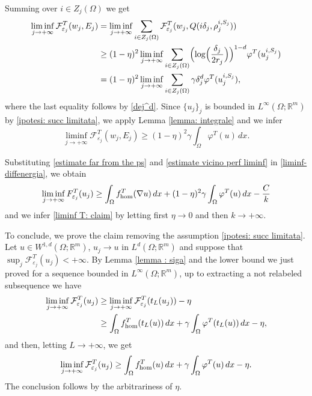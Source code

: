 \documentclass{article}
\theoremstyle{plain}
\theoremstyle{definition}
\def\rr{{\mathbb R}}
\newcommand{\f}{\varphi}
\newcommand{\ej}{\varepsilon_j}
\newcommand{\rj}{r_j}
\newcommand{\dej}{\delta_j}
\newcommand{\F}{\mathcal{F}}
\numberwithin{equation}{section}
\begin{document}
Summing over $i\in Z_j(\Omega)$ we get
\begin{align*}
\liminf_{j\to+\infty} \F^T_{\ej}(w_j, E_j) & = \liminf_{j\to+\infty} \sum_{i\in Z_j(\Omega)} \F^T_{\ej}(w_j, Q(i\delta_{j},\rho^{i, S_j}_{j})) \\
& \geq (1-\eta)^2\liminf_{j\to+\infty} \sum_{i\in Z_j(\Omega)}\Bigl(\log\Bigl(\frac{\dej}{2\rj}\Bigr)\Bigr)^{1-d}\f^T(u_j^{i,S_j}) \\
& =  (1-\eta)^2\liminf_{j\to+\infty} \sum_{i\in Z_j(\Omega)} \gamma\dej^d\f^T(u_j^{i,S_j}),
\end{align*}
where the last equality follows by \eqref{dej^d}. Since $\{u_j\}_j$ is bounded in $L^\infty(\Omega;\rr^m)$ by \eqref{ipotesi: succ limitata}, we apply Lemma \ref{lemma: integrale} and we infer
\begin{equation}\label{estimate vicino perf liminf}
    \liminf_{j\to+\infty} \F^T_{\ej}(w_j, E_j) \geq (1-\eta)^2\gamma \int_\Omega \f^T(u)\,dx.
\end{equation}

Substituting \eqref{estimate far from the ps} and \eqref{estimate vicino perf liminf} in \eqref{liminf-diffenergia}, we obtain
\begin{equation*}
    \liminf_{j\to+\infty} F_{\ej}^T(u_j)\geq \int_\Omega f^T_{\rm hom}(\nabla u)\, dx + (1-\eta)^2\gamma\int_\Omega \f^T(u)\,dx-\frac{C}{k}
\end{equation*}
and we infer \eqref{liminf T: claim} by letting first $\eta\to0$ and then $k\to+\infty$.

To conclude, we prove the claim removing the assumption \eqref{ipotesi: succ limitata}. Let $u\in W^{1,d}(\Omega;\rr^m)$, $u_j\to u$ in $L^d(\Omega; \rr^m)$ and suppose that $\sup_j \F^T_{\ej}(u_j)<+\infty$. By Lemma \ref{lemma : siga} and the lower bound we just proved for a sequence bounded in $L^\infty(\Omega;\rr^m)$, up to extracting a not relabeled subsequence we have
\begin{align*}
    \liminf_{j\to+\infty} \F^T_{\ej}(u_j) & \geq \liminf_{j\to+\infty} \F^T_{\ej}(t_L(u_j))-\eta \\
    & \geq \int_{\Omega} f^T_{\rm hom}(t_L(u))\,dx+\gamma\int_\Omega\f^T(t_L(u))\,dx-\eta, 
\end{align*}
 and then, letting $L\to+\infty$, we get
\begin{equation*}
    \liminf_{j\to+\infty} \F^T_{\ej}(u_j) \geq \int_{\Omega} f^T_{\rm hom}(u)\,dx+\gamma\int_\Omega\f^T(u)\,dx-\eta.
\end{equation*}
The conclusion follows by the arbitrariness of $\eta$.
\end{document}
